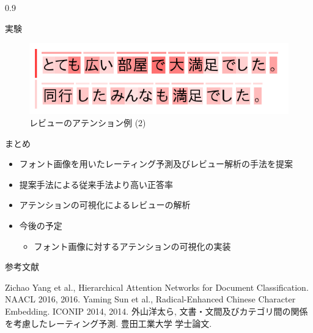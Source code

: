 \documentclass[unicode,10pt]{beamer}
\newlength{\mycolumnwidth}
\newcommand{\itemtitle}[1]{#1\\}
\begin{document}
\begin{frame}[t]
\begin{columns}[onlytextwidth,t]
\begin{column}{0.9\mycolumnwidth}
\begin{block}{実験}
      \begin{figure}
        \centering
        \includegraphics[width=0.8\linewidth]{fig/review_2.png}
        \caption*{レビューのアテンション例 (2)}
      \end{figure}
    \end{block}

    \begin{block}{まとめ}
      \begin{itemize}
        \item フォント画像を用いたレーティング予測及びレビュー解析の手法を提案
        \item 提案手法による従来手法\cite{yang16}より高い正答率
        \item アテンションの可視化によるレビューの解析
        \item \itemtitle{今後の予定}
          \begin{itemize}
            \item フォント画像に対するアテンションの可視化の実装
          \end{itemize}
      \end{itemize}
    \end{block}

    \vspace{2ex} %
    参考文献
    
    \begin{thebibliography}{9}
        Zichao Yang et al.,
        Hierarchical Attention Networks for Document Classification.
        NAACL 2016, 2016.
        Yaming Sun et al.,
        Radical-Enhanced Chinese Character Embedding.
        ICONIP 2014, 2014.
        外山洋太ら,
        文書・文間及びカテゴリ間の関係を考慮したレーティング予測.
        豊田工業大学 学士論文.
    \end{thebibliography}
  \end{column}
\end{columns}

\end{frame}
\end{document}
